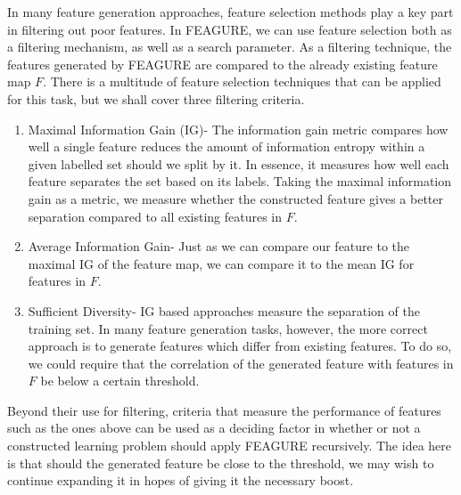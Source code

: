 \documentclass[twoside,11pt]{article}
\theoremstyle{definition}
\begin{document}
In many feature generation approaches, feature selection methods play a key part in filtering out poor features. In FEAGURE, we can use feature selection both as a filtering mechanism, as well as a search parameter.
As a filtering technique, the features generated by FEAGURE are compared to the already existing feature map $F$. There is a multitude of feature selection techniques that can be applied for this task, but we shall cover three filtering criteria.
\begin{enumerate}
	\item Maximal Information Gain (IG)- The information gain metric \cite{quinlan1986} compares how well a single feature reduces the amount of information entropy within a given labelled set should we split by it. In essence, it measures how well each feature separates the set based on its labels. Taking the maximal information gain as a metric, we measure whether the constructed feature gives a better separation compared to all existing features in $F$.
	\item Average Information Gain- Just as we can compare our feature to the maximal IG of the feature map, we can compare it to the mean IG for features in $F$.
	\item Sufficient Diversity- IG based approaches measure the separation of the training set. In many feature generation tasks, however, the more correct approach is to generate features which differ from existing features. To do so, we could require that the correlation of the generated feature with features in $F$ be below a certain threshold.
\end{enumerate}
Beyond their use for filtering, criteria that measure the performance of features such as the ones above can be used as a deciding factor in whether or not a constructed learning problem should apply FEAGURE recursively. The idea here is that should the generated feature be close to the threshold, we may wish to continue expanding it in hopes of giving it the necessary boost.
\end{document}
